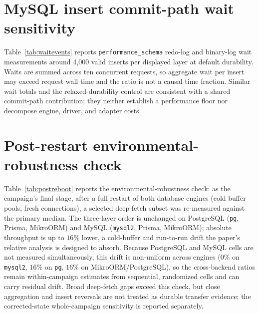 \documentclass[11pt,a4paper]{article}
\newcommand{\tabledir}{tables/}
\begin{document}


\section{MySQL insert commit-path wait sensitivity}
\label{sup:waitevents}
Table~\ref{tab:waitevents} reports \texttt{performance\_schema} redo-log and
binary-log wait measurements around 4,000 valid inserts per displayed layer at
default durability. Waits are summed across ten concurrent requests, so aggregate
wait per insert may exceed request wall time and the ratio is not a causal time
fraction. Similar wait totals and the relaxed-durability control are consistent
with a shared commit-path contribution; they neither establish a performance
floor nor decompose engine, driver, and adapter costs.



\section{Post-restart environmental-robustness check}
\label{sup:postreboot}
Table~\ref{tab:postreboot} reports the environmental-robustness check: as the
campaign's final stage, after a full restart of both database engines (cold buffer
pools, fresh connections), a selected deep-fetch subset was re-measured against
the primary median. The three-layer order is unchanged on PostgreSQL (\texttt{pg}, Prisma, MikroORM)
and MySQL (\texttt{mysql2}, Prisma, MikroORM); absolute throughput is up to $16\%$ lower, a cold-buffer and run-to-run
drift the paper's relative analysis is designed to absorb. Because PostgreSQL and
MySQL cells are not measured simultaneously, this drift is non-uniform across engines
($0\%$ on \texttt{mysql2}, $16\%$ on \texttt{pg}, $16\%$ on MikroORM/PostgreSQL), so
the cross-backend ratios remain within-campaign estimates from sequential, randomized cells and can carry residual drift. Broad deep-fetch gaps exceed this check, but close aggregation and insert reversals are not treated as durable transfer evidence; the corrected-state whole-campaign sensitivity is reported separately.


\end{document}
